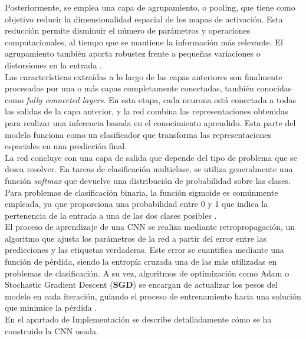 \documentclass[12pt]{article} %
\begin{document}
Posteriormente, se emplea una capa de agrupamiento, o pooling, que tiene como objetivo reducir la dimensionalidad espacial de los mapas de activación. Esta reducción permite disminuir el número de parámetros y operaciones computacionales, al tiempo que se mantiene la información más relevante. El agrupamiento también aporta robustez frente a pequeñas variaciones o distorsiones en la entrada \cite{sermanet2013overfeat}. \\

Las características extraídas a lo largo de las capas anteriores son finalmente procesadas por una o más capas completamente conectadas, también conocidas como \textit{fully connected layers}. En esta etapa, cada neurona está conectada a todas las salidas de la capa anterior, y la red combina las representaciones obtenidas para realizar una inferencia basada en el conocimiento aprendido. Esta parte del modelo funciona como un clasificador que transforma las representaciones espaciales en una predicción final.\\

La red concluye con una capa de salida que depende del tipo de problema que se desea resolver. En tareas de clasificación multiclase, se utiliza generalmente una función \textit{softmax} que devuelve una distribución de probabilidad sobre las clases. Para problemas de clasificación binaria, la función sigmoide es comúnmente empleada, ya que proporciona una probabilidad entre 0 y 1 que indica la pertenencia de la entrada a una de las dos clases posibles \cite{bishop2006pattern}.\\

El proceso de aprendizaje de una CNN se realiza mediante retropropagación, un algoritmo que ajusta los parámetros de la red a partir del error entre las predicciones y las etiquetas verdaderas. Este error se cuantifica mediante una función de pérdida, siendo la entropía cruzada una de las más utilizadas en problemas de clasificación. A su vez, algoritmos de optimización como Adam o Stochastic Gradient Descent (\textbf{SGD}) se encargan de actualizar los pesos del modelo en cada iteración, guiando el proceso de entrenamiento hacia una solución que minimice la pérdida \cite{kingma2014adam,rumelhart1986learning}. \\

En el apartado de Implementación se describe detalladamente cómo se ha construido la CNN usada.
\end{document}

